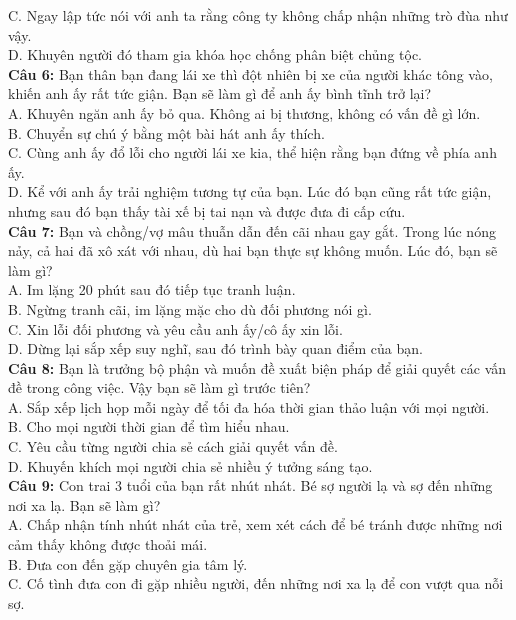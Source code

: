 \begin{multicols}{2}
C. Ngay lập tức nói với anh ta rằng công ty không chấp nhận những trò đùa như vậy. \\
D. Khuyên người đó tham gia khóa học chống phân biệt chủng tộc. \\
\textbf{Câu 6:} Bạn thân bạn đang lái xe thì đột nhiên bị xe của người khác tông vào, khiến anh ấy rất tức giận. Bạn sẽ làm gì để anh ấy bình tĩnh trở lại? \\
A. Khuyên ngăn anh ấy bỏ qua. Không ai bị thương, không có vấn đề gì lớn. \\
B. Chuyển sự chú ý bằng một bài hát anh ấy thích. \\
C. Cùng anh ấy đổ lỗi cho người lái xe kia, thể hiện rằng bạn đứng về phía anh ấy. \\
D. Kể với anh ấy trải nghiệm tương tự của bạn. Lúc đó bạn cũng rất tức giận, nhưng sau đó bạn thấy tài xế bị tai nạn và được đưa đi cấp cứu. \\
\textbf{Câu 7:} Bạn và chồng/vợ mâu thuẫn dẫn đến cãi nhau gay gắt. Trong lúc nóng nảy, cả hai đã xô xát với nhau, dù hai bạn thực sự không muốn. Lúc đó, bạn sẽ làm gì? \\
A. Im lặng 20 phút sau đó tiếp tục tranh luận. \\
B. Ngừng tranh cãi, im lặng mặc cho dù đối phương nói gì. \\
C. Xin lỗi đối phương và yêu cầu anh ấy/cô ấy xin lỗi. \\
D. Dừng lại sắp xếp suy nghĩ, sau đó trình bày quan điểm của bạn. \\
\textbf{Câu 8:} Bạn là trưởng bộ phận và muốn đề xuất biện pháp để giải quyết các vấn đề trong công việc. Vậy bạn sẽ làm gì trước tiên? \\
A. Sắp xếp lịch họp mỗi ngày để tối đa hóa thời gian thảo luận với mọi người. \\
B. Cho mọi người thời gian để tìm hiểu nhau. \\
C. Yêu cầu từng người chia sẻ cách giải quyết vấn đề. \\
D. Khuyến khích mọi người chia sẻ nhiều ý tưởng sáng tạo. \\
\textbf{Câu 9:} Con trai 3 tuổi của bạn rất nhút nhát. Bé sợ người lạ và sợ đến những nơi xa lạ. Bạn sẽ làm gì? \\
A. Chấp nhận tính nhút nhát của trẻ, xem xét cách để bé tránh được những nơi cảm thấy không được thoải mái. \\
B. Đưa con đến gặp chuyên gia tâm lý. \\
C. Cố tình đưa con đi gặp nhiều người, đến những nơi xa lạ để con vượt qua nỗi sợ. \\

\end{multicols}
